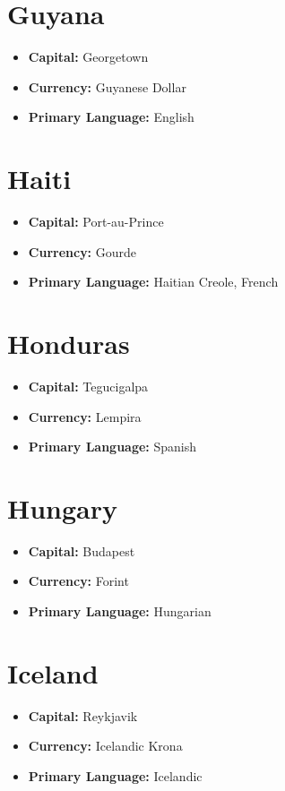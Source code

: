 \documentclass[a4paper,100pt,twoside]{book}
\begin{document}
\section*{\Huge Guyana}
\vspace{5mm} %
\begin{itemize}
	\item \textbf{Capital:} Georgetown
	\item \textbf{Currency:} Guyanese Dollar
	\item \textbf{Primary Language:} English
\end{itemize}

\section*{\Huge Haiti}
\vspace{5mm} %
\begin{itemize}
	\item \textbf{Capital:} Port-au-Prince
	\item \textbf{Currency:} Gourde
	\item \textbf{Primary Language:} Haitian Creole, French
\end{itemize}

\section*{\Huge Honduras}
\vspace{5mm} %
\begin{itemize}
	\item \textbf{Capital:} Tegucigalpa
	\item \textbf{Currency:} Lempira
	\item \textbf{Primary Language:} Spanish
\end{itemize}

\section*{\Huge Hungary}
\vspace{5mm} %
\begin{itemize}
	\item \textbf{Capital:} Budapest
	\item \textbf{Currency:} Forint
	\item \textbf{Primary Language:} Hungarian
\end{itemize}

\section*{\Huge Iceland}
\vspace{5mm} %
\begin{itemize}
	\item \textbf{Capital:} Reykjavik
	\item \textbf{Currency:} Icelandic Krona
	\item \textbf{Primary Language:} Icelandic
\end{itemize}
\end{document}

